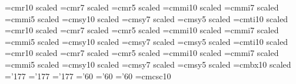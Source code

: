 


\noblackbox
%
%
%
\def\HUTP#1#2{\Title{HUTP-\number\yearltd/A#1}{#2}}
\def\Title#1#2{\ifx\answ\bigans \nopagenumbers
\abstractfont\hsize=\hstitle\rightline{#1}%
\vskip .5in\centerline{\titlefont #2}\abstractfont\vskip .5in\pageno=0
\else \rightline{#1}
\vskip .8in\centerline{\titlefont #2}%
\vskip .5in\pageno=1\fi}
\ifx\answ\bigans
\font\titlerm=cmr10 scaled \font\titlerms=cmr7 scaled
\font\titlermss=cmr5 scaled \font\titlei=cmmi10 scaled
\font\titleis=cmmi7 scaled \font\titleiss=cmmi5 scaled
\font\titlesy=cmsy10 scaled \font\titlesys=cmsy7 scaled
\font\titlesyss=cmsy5 scaled \font\titleit=cmti10 scaled
\else
\font\titlerm=cmr10 scaled \font\titlerms=cmr7 scaled
\font\titlermss=cmr5 scaled \font\titlei=cmmi10 scaled
\font\titleis=cmmi7 scaled \font\titleiss=cmmi5 scaled
\font\titlesy=cmsy10 scaled \font\titlesys=cmsy7 scaled
\font\titlesyss=cmsy5 scaled \font\titleit=cmti10 scaled
\font\absrm=cmr10 scaled \font\absrms=cmr7 scaled
\font\absrmss=cmr5 scaled \font\absi=cmmi10 scaled
\font\absis=cmmi7 scaled \font\absiss=cmmi5 scaled
\font\abssy=cmsy10 scaled \font\abssys=cmsy7 scaled
\font\abssyss=cmsy5 scaled \font\absbf=cmbx10 scaled
\skewchar\absi='177 \skewchar\absis='177 \skewchar\absiss='177
\skewchar\abssy='60 \skewchar\abssys='60 \skewchar\abssyss='60
\fi
%
%
\font\ticp=cmcsc10
\def\hf{{1\over2}}
\def\sq{{\vbox {\hrule height 0.6pt\hbox{\vrule width 0.6pt\hskip 3pt
   \vbox{\vskip 6pt}\hskip 3pt \vrule width 0.6pt}\hrule height 0.6pt}}}
\def\ajou#1&#2(#3){\ \sl#1\bf#2\rm(19#3)}
